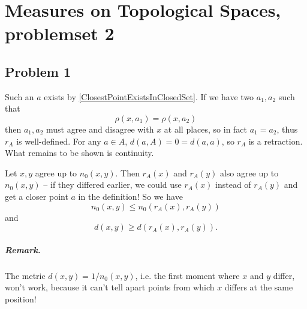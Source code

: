 \chapter{Measures on Topological Spaces, problemset 2}

\section{Problem 1}

Such an \( a \) exists by \ref{ClosestPointExistsInClosedSet}. If we have two \( a_1, a_2 \) such that 
\[ 
    \rho(x, a_1) = \rho(x, a_2) 
\]
then \( a_1, a_2 \) must agree and disagree with \( x \) at all places, so in fact \( a_1 = a_2 \), thus \( r_A \) is well-defined. For any \( a \in A \), \( d(a,A) = 0 = d(a,a) \), so \( r_A \) is a retraction. What remains to be shown is continuity.

Let \( x, y \) agree up to \( n_0(x,y) \). Then \( r_A(x) \) and \( r_A(y) \) also agree up to \( n_0(x,y) \) -- if they differed earlier, we could use \( r_A(x) \) instead of \( r_A(y) \) and get a closer point \( a \) in the definition! So we have
\[ 
    n_0(x, y) \leqslant n_0 \left( r_A(x), r_A(y) \right) 
\]
and
\[ 
    d(x,y) \geqslant d \left(  r_A(x), r_A(y) \right).
\]

\paragraph{Remark.} The metric \( d(x,y) = 1/n_0(x,y) \), i.e. the first moment where \( x \) and \( y \) differ, won't work, because it can't tell apart points from which \( x \) differs at the same position!
